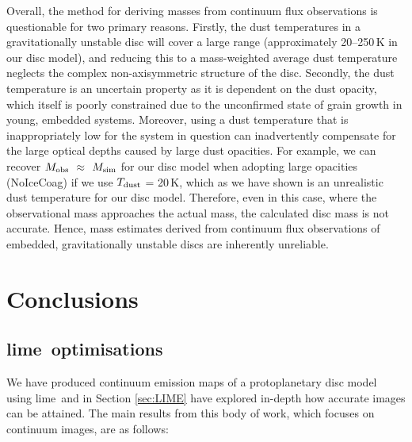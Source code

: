 \documentclass[fleqn,usenatbib]{mnras}
\newcommand{\lime}{{\sc lime}}
\begin{document}
\smallskip

Overall, the method for deriving masses from continuum flux observations is questionable for two primary reasons. Firstly, the dust temperatures in a gravitationally unstable disc will cover a large range (approximately 20--250\,K in our disc model), and reducing this to a mass-weighted average dust temperature neglects the complex non-axisymmetric structure of the disc. Secondly, the dust temperature is an uncertain property as it is dependent on the dust opacity, which itself is poorly constrained due to the unconfirmed state of grain growth in young, embedded systems. Moreover, using a dust temperature that is inappropriately low for the system in question can inadvertently compensate for the large optical depths caused by large dust opacities. For example, we can recover $M_ {\rm obs}$ $\approx$ $M_ {\rm sim}$ for our disc model when adopting large opacities (NoIceCoag) if we use $T_ {\rm dust}$ = 20\,K, which as we have shown is an unrealistic dust temperature for our disc model. Therefore, even in this case, where the observational mass approaches the actual mass, the calculated disc mass is not accurate. Hence, mass estimates derived from continuum flux observations of embedded, gravitationally unstable discs are inherently unreliable.

\section{Conclusions}
\label{sec:conclusions}

\subsection{\lime\ optimisations}

We have produced continuum emission maps of a protoplanetary disc model using \lime\ and in Section \ref{sec:LIME} have explored in-depth how accurate images can be attained. The main results from this body of work, which focuses on continuum images, are as follows:
\end{document}
